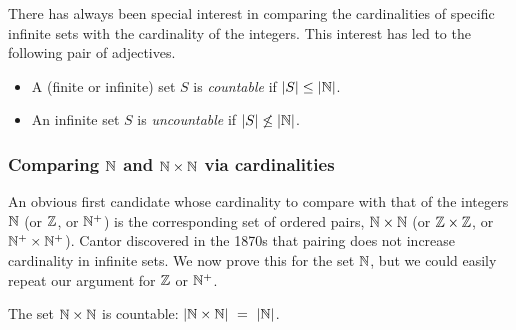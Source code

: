 There has always been special interest in comparing the cardinalities of
specific infinite sets with the cardinality of the integers.  This
interest has led to the following pair of adjectives.

  
\begin{itemize}
\item
A (finite or infinite) set $S$ is {\it countable} if $|S| \leq |\mathbb{N}|$.

 
\item
An infinite set $S$ is {\it uncountable} if $|S| \not\leq |\mathbb{N}|$.
\end{itemize}

\subsubsection{Comparing $\mathbb{N}$ and $\mathbb{N} \times \mathbb{N}$ via cardinalities}
\label{sec:compare-NxN-N-via-card}

An obvious first candidate whose cardinality to compare with that of
the integers $\mathbb{N}$ (or $\mathbb{Z}$, or $\mathbb{N}^+$) is the corresponding set of
ordered pairs, $\mathbb{N} \times \mathbb{N}$ (or $\mathbb{Z} \times \mathbb{Z}$, or $\mathbb{N}^+ \times
\mathbb{N}^+$).  Cantor discovered in the 1870s that pairing does not increase
cardinality in infinite sets.  We now prove this for the set $\mathbb{N}$, but
we could easily repeat our argument for $\mathbb{Z}$ or $\mathbb{N}^+$.

\begin{prop}
\label{thm:|NxN|=|N|}
The set $\mathbb{N} \times \mathbb{N}$ is countable:
$|\mathbb{N} \times \mathbb{N}| \ = \ |\mathbb{N}|$.
\end{prop}



